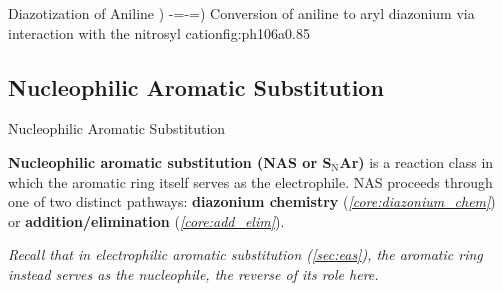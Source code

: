 \begin{core}[label=core:diazotization]{Diazotization of Aniline}
{{{              )
              -=-=)
            }
            \arrow{->}
            \arrow{->}
          }
        }{Conversion of aniline to aryl diazonium via interaction with the nitrosyl cation}{fig:ph106a}{0.85}

      \end{core}

  \subsection{Nucleophilic Aromatic Substitution}

    \begin{core}{Nucleophilic Aromatic Substitution}

      \textbf{Nucleophilic aromatic substitution (NAS or S$_\text{N}$Ar)} is a reaction class in which the aromatic ring itself serves as the electrophile. NAS proceeds through one of two distinct pathways: \textbf{diazonium chemistry} (\textit{\autoref{core:diazonium_chem}}) or \textbf{addition/elimination} (\textit{\autoref{core:add_elim}}).

      \textit{Recall that in electrophilic aromatic substitution (\autoref{sec:eas}), the aromatic ring instead serves as the nucleophile, the reverse of its role here.}

    \end{core}

